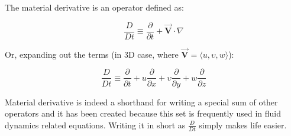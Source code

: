 The material derivative is an operator defined as:

\begin{equation}
\frac{D}{D t} \equiv \frac{\partial}{\partial t} + \vec{\bm{V}} \cdot \nabla
\end{equation}

Or, expanding out the terms (in 3D case, where $\vec{\bm{V}} = \langle u, \upsilon, w \rangle$):

\begin{equation}
\frac{D}{D t} \equiv \frac{\partial}{\partial t} + u \frac{\partial}{\partial x} + \upsilon \frac{\partial}{\partial y} + w \frac{\partial}{\partial z}
\end{equation}

Material derivative is indeed a shorthand for writing a special sum of other operators and it has been created because this set is frequently used in fluid dynamics related equations. Writing it in short as $\frac{D}{D t}$ simply makes life easier.